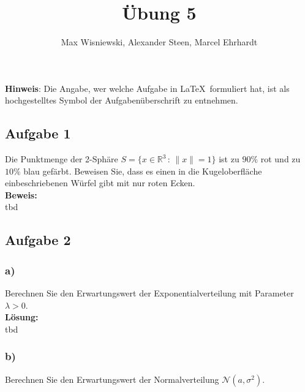 \documentclass[11pt,a4paper,ngerman]{article}
\date{}
\title{Übung 5}
\author{Max Wisniewski\maxw, Alexander Steen\alex, Marcel Ehrhardt\marcel}
\begin{document}

\renewcommand{\figurename}{Figure}

\maketitle
\thispagestyle{fancy}

\begin{center}
\textbf{Hinweis}: Die Angabe, wer welche Aufgabe in \LaTeX\ formuliert hat, ist als hochgestelltes Symbol der Aufgabenüberschrift zu entnehmen.
\end{center}


\subsection*{Aufgabe 1}

Die Punktmenge der 2-Sphäre $S = \{ x \in \mathbb{R}^3 \, : \, \|x\| = 1\}$ ist zu $90\%$ rot und zu $10\%$ blau gefärbt. Beweisen Sie,
dass es einen in die Kugeloberfläche einbeschriebenen Würfel gibt mit nur roten Ecken.\\

\textbf{Beweis:}\\

tbd

\subsection*{Aufgabe 2}

\subsubsection*{a)}

Berechnen Sie den Erwartungswert der Exponentialverteilung mit Parameter $\lambda > 0$.\\

\textbf{Lösung:}\\

tbd


\subsubsection*{b)}

Berechnen Sie den Erwartungswert der Normalverteilung $\mathcal{N}(a, \sigma^2)$.\\
\end{document}
